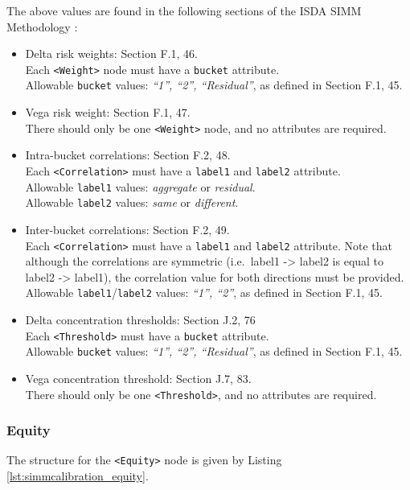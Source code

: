 The above values are found in the following sections of the ISDA SIMM Methodology \cite{SIMM2.6}:
\begin{itemize}
  \item Delta risk weights: Section F.1, 46. \\
    Each {\tt <Weight>} node must have a {\tt bucket} attribute.\\
    Allowable {\tt bucket} values: \emph{``1'', ``2'', ``Residual''}, as defined in Section F.1, 45.
  \item Vega risk weight: Section F.1, 47. \\
    There should only be one {\tt <Weight>} node, and no attributes are required.
  \item Intra-bucket correlations: Section F.2, 48. \\
    Each {\tt <Correlation>} must have a {\tt label1} and {\tt label2} attribute. \\
    Allowable {\tt label1} values: \emph{aggregate} or \emph{residual}. \\
    Allowable {\tt label2} values: \emph{same} or \emph{different}.
  \item Inter-bucket correlations: Section F.2, 49. \\
    Each {\tt <Correlation>} must have a {\tt label1} and {\tt label2} attribute. Note that although the correlations
    are symmetric (i.e.\ label1 -> label2 is equal to label2 -> label1), the correlation value for both directions must be
    provided. \\
    Allowable {\tt label1}/{\tt label2} values: \emph{``1'', ``2''}, as defined in Section F.1, 45.
  \item Delta concentration thresholds: Section J.2, 76 \\
    Each {\tt <Threshold>} must have a {\tt bucket} attribute. \\
    Allowable {\tt bucket} values: \emph{``1'', ``2'', ``Residual''}, as defined in Section F.1, 45.
  \item Vega concentration threshold: Section J.7, 83. \\
    There should only be one {\tt <Threshold>}, and no attributes are required.
\end{itemize}

\subsubsection{Equity}
The structure for the {\tt <Equity>} node is given by Listing \ref{lst:simmcalibration_equity}.

